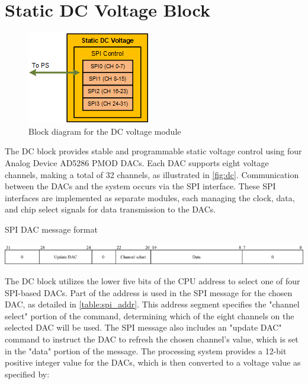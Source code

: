 \section{Static DC Voltage Block}
\begin{figure}[h]
    \setlength{\abovecaptionskip}{5pt}    %
    \setlength{\belowcaptionskip}{5pt}    %
    \centering
    \includegraphics[width=0.5\linewidth]{figures/5.2.png}
    \caption{Block diagram for the DC voltage module}
    \label{fig:dc}
\end{figure}
The DC block provides stable and programmable static voltage control using four Analog Device AD5286 PMOD DACs. Each DAC supports eight voltage channels, making a total of 32 channels, as illustrated in \autoref{fig:dc}. Communication between the DACs and the system occurs via the SPI interface. These SPI interfaces are implemented as separate modules, each managing the clock, data, and chip select signals for data transmission to the DACs.

\begin{table}[h]
\centering
\setlength{\abovecaptionskip}{5pt}    %
\setlength{\belowcaptionskip}{5pt}    %
\caption{SPI DAC message format}

\includegraphics[width=1.0\textwidth]{figures/spi_addr.png}
\label{table:spi_addr}
\end{table}

The DC block utilizes the lower five bits of the CPU address to select one of four SPI-based DACs. Part of the address is used in the SPI message for the chosen DAC, as detailed in \autoref{table:spi_addr}. This address segment specifies the "channel select" portion of the command, determining which of the eight channels on the selected DAC will be used. The SPI message also includes an "update DAC" command to instruct the DAC to refresh the chosen channel's value, which is set in the "data" portion of the message. The processing system provides a 12-bit positive integer value for the DACs, which is then converted to a voltage value as specified by:

